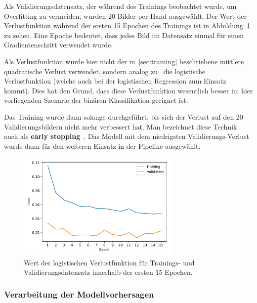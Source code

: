 Als Validierungsdatensatz, der w\"ahrend des Trainings beobachtet wurde,
um Overfitting zu vermeiden, wurden 20 Bilder per Hand ausgew\"ahlt.
Der Wert der Verlustfunktion w\"ahrend der ersten 15 Epochen des Trainings ist in
Abbildung~\ref{fig:training-loss} zu sehen.
Eine Epoche bedeutet, dass jedes Bild im Datensatz einmal f\"ur einen
Gradientenschritt verwendet wurde.

Als Verlustfunktion wurde hier nicht der in~\ref{sec:training} beschriebene
mittlere quadratische Verlust verwendet, sondern analog zu~\cite{image-segmentation}
die logistische Verlustfunktion (welche auch bei der logistischen Regression zum Einsatz kommt).
Dies hat den Grund, dass diese Verlustfunktion wesentlich besser im
hier vorliegenden Szenario der bin\"aren Klassifikation geeignet ist.

Das Training wurde dann solange durchgef\"uhrt, bis sich der Verlust auf den
20 Validierungsbildern nicht mehr verbessert hat. Man bezeichnet diese
Technik auch als \textbf{early stopping}~\cite{Goodfellow-et-al-2016}.
Das Modell mit dem niedrigsten Validierungs-Verlust wurde dann f\"ur
den weiteren Einsatz in der Pipeline ausgew\"ahlt.

\begin{figure}
    \centering
    \includegraphics[width=0.7\textwidth]{abbildungen/training_plot}
    \caption{Wert der logistischen Verlustfunktion f\"ur Trainings- und Validierungsdatensatz
        innerhalb der ersten 15 Epochen.}
    \label{fig:training-loss}
\end{figure}

\subsubsection{Verarbeitung der Modellvorhersagen}

